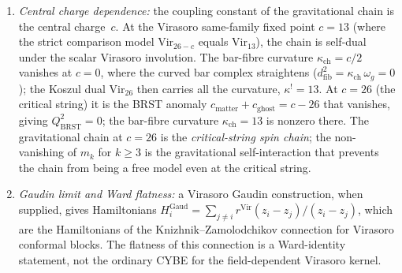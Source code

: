 \begin{construction}
\begin{enumerate}[label=\textup{(\roman*)}]
\item \emph{Central charge dependence:} the coupling
 constant of the gravitational chain is the central
 charge~$c$. At the Virasoro same-family fixed point $c = 13$
 (where the strict comparison model $\mathrm{Vir}_{26-c}$ equals
 $\mathrm{Vir}_{13}$), the chain is self-dual under the scalar
 Virasoro involution. The bar-fibre curvature $\kappa_{\mathrm{ch}} = c/2$
 vanishes at $c = 0$, where the curved bar complex straightens
 ($d^2_{\mathrm{fib}} = \kappa_{\mathrm{ch}}\,\omega_g = 0$);
 the Koszul dual $\mathrm{Vir}_{26}$ then carries all the
 curvature, $\kappa^! = 13$. At $c = 26$ (the critical string)
 it is the BRST anomaly $c_{\mathrm{matter}} + c_{\mathrm{ghost}}
 = c - 26$ that vanishes, giving $Q_{\mathrm{BRST}}^2 = 0$;
 the bar-fibre curvature $\kappa_{\mathrm{ch}} = 13$ is nonzero
 there. The gravitational chain at $c = 26$ is the
 \emph{critical-string spin chain}; the non-vanishing
 of $m_k$ for $k \ge 3$ is the gravitational
 self-interaction that prevents the chain from being
 a free model even at the critical string.

\item \emph{Gaudin limit and Ward flatness:}
 a Virasoro Gaudin construction, when supplied,
 gives Hamiltonians
 $H_i^{\mathrm{Gaud}} = \sum_{j \ne i}
 r^{\mathrm{Vir}}(z_i - z_j)/(z_i - z_j)$,
 which are the Hamiltonians of the Knizhnik--Zamolodchikov
 connection for Virasoro conformal blocks. The flatness
 of this connection is a Ward-identity statement, not the ordinary
 CYBE for the field-dependent Virasoro kernel.
\end{enumerate}
\end{construction}

